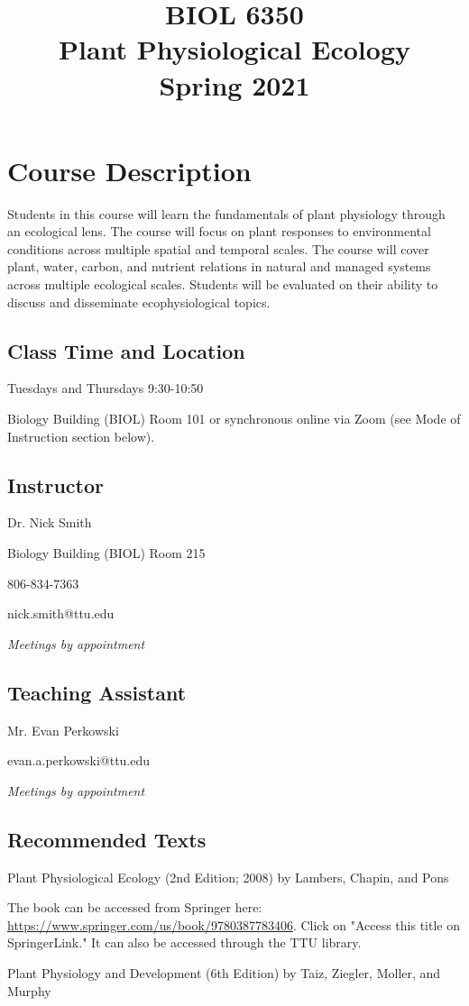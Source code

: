 \documentclass[12pt, notitlepage]{article}   	%
\title{
	\textbf{
		BIOL 6350
	} \\
	\large Plant Physiological Ecology \\
	\large Spring 2021
}
\date{\vspace{-5ex}}
\begin{document}
{\selectfont %

\maketitle

\section{Course Description}
Students in this course will learn the fundamentals of plant physiology through 
an ecological lens. The course will focus on plant responses to environmental conditions 
across multiple spatial and temporal scales. The course will cover plant, water, carbon, 
and nutrient relations in natural and managed systems across multiple ecological scales. 
Students will be evaluated on their 
ability to discuss and disseminate ecophysiological topics.

\subsection{Class Time and Location}
Tuesdays and Thursdays 9:30-10:50

Biology Building (BIOL) Room 101 or 
synchronous online via Zoom (see Mode of Instruction section below).

\subsection{Instructor}
Dr. Nick Smith \par
Biology Building (BIOL) Room 215 \par
806-834-7363 \par
nick.smith@ttu.edu \par
\textit{Meetings by appointment}

\subsection{Teaching Assistant}
Mr. Evan Perkowski \par
evan.a.perkowski@ttu.edu \par
\textit{Meetings by appointment}

\subsection{Recommended Texts}
Plant Physiological Ecology (2nd Edition; 2008) by Lambers, Chapin, and Pons \par
The book can be accessed from Springer here: 
\url{https://www.springer.com/us/book/9780387783406}. Click on "Access this title on 
SpringerLink." It can also be accessed through the TTU library. \par
Plant Physiology and Development (6th Edition) by Taiz, Ziegler, Moller, and Murphy

}
\end{document}
